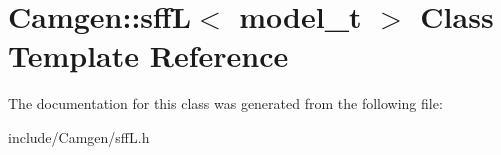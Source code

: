 \hypertarget{a00493}{\section{Camgen\-:\-:sff\-L$<$ model\-\_\-t $>$ Class Template Reference}
\label{a00493}
}


The documentation for this class was generated from the following file\-:\begin{DoxyCompactItemize}
\item 
include/\-Camgen/sff\-L.\-h\end{DoxyCompactItemize}
